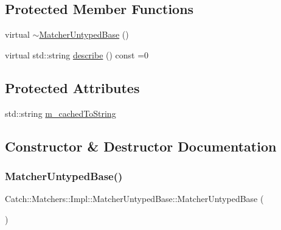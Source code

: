 \subsection*{Protected Member Functions}
\begin{DoxyCompactItemize}
\item 
virtual \mbox{\hyperlink{class_catch_1_1_matchers_1_1_impl_1_1_matcher_untyped_base_a853be93ce33f71b5abede38081c79e9d}{$\sim$\+Matcher\+Untyped\+Base}} ()
\item 
virtual std\+::string \mbox{\hyperlink{class_catch_1_1_matchers_1_1_impl_1_1_matcher_untyped_base_a91d3a907dbfcbb596077df24f6e11fe2}{describe}} () const =0
\end{DoxyCompactItemize}
\subsection*{Protected Attributes}
\begin{DoxyCompactItemize}
\item 
std\+::string \mbox{\hyperlink{class_catch_1_1_matchers_1_1_impl_1_1_matcher_untyped_base_a951095c462657e7097a9a6dc4dde813f}{m\+\_\+cached\+To\+String}}
\end{DoxyCompactItemize}


\subsection{Constructor \& Destructor Documentation}
\mbox{\label{class_catch_1_1_matchers_1_1_impl_1_1_matcher_untyped_base_ab65764dc245d85e2b268d3be870b650a}} 
\subsubsection{\texorpdfstring{Matcher\+Untyped\+Base()}{MatcherUntypedBase()}\hspace{0.1cm}{\footnotesize\ttfamily [1/2]}}
{\footnotesize\ttfamily Catch\+::\+Matchers\+::\+Impl\+::\+Matcher\+Untyped\+Base\+::\+Matcher\+Untyped\+Base (\begin{DoxyParamCaption}{ }\end{DoxyParamCaption})\hspace{0.3cm}{\ttfamily [default]}}

